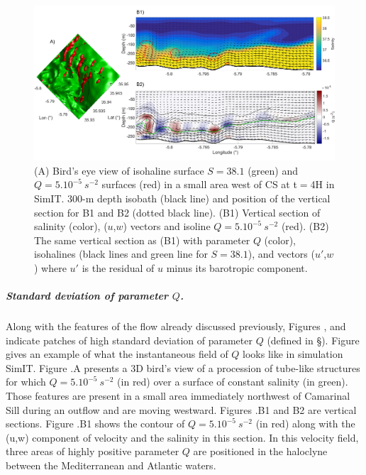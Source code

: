 \begin{figure}[!h]
 \includegraphics[width=\textwidth]{./GBR3D/FigInstaQ_IES4H.png}
 \caption [Exemple of primary shear instabilities in simIT.]{(A) Bird's eye view of isohaline surface $S=38.1$ (green) and $Q=5.10^{-5} \ s^{-2}$ surfaces (red) in a small area west of CS at t$=$4H in SimIT. 300-m depth isobath (black line) and position of the vertical section for B1 and B2 (dotted black line). (B1) Vertical section of salinity (color), ($u$,$w$) vectors and isoline $Q=5.10^{-5}\ s^{-2}$ (red). (B2) The same vertical section as (B1) with parameter $Q$ (color), isohalines (black lines and green line for $S=38.1$), and vectors ($u'$,$w$) where $u'$ is the residual of $u$ minus its barotropic component.}
 \label{FigInstaEx}
\end{figure}

\subparagraph{Standard deviation of parameter $Q$.}
Along with the features of the flow already discussed previously, Figures ,  and  indicate patches of high standard deviation of parameter $Q$ (defined in \S {}). Figure  gives an example of what the instantaneous field of $Q$ looks like in simulation SimIT. Figure .A presents a 3D bird's view of a procession of tube-like structures for which $Q=5.10^{-5} \ s^{-2}$ (in red) over a surface of constant salinity (in green). Those features are present in a small area immediately northwest of Camarinal Sill during an outflow and are moving westward. Figures .B1 and B2 are vertical sections. Figure .B1 shows the contour of $Q=5.10^{-5} \ s^{-2}$ (in red) along with the (u,w) component of velocity and the salinity in this section. In this velocity field, three areas of highly positive parameter $Q$ are positioned in the haloclyne between the Mediterranean and Atlantic waters.

